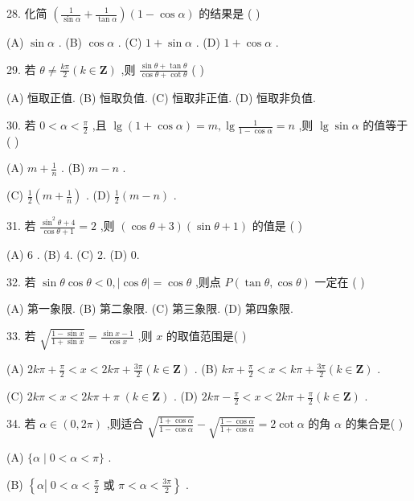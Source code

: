 \documentclass[10pt]{article}
\begin{document}
28. 化简 \(\left( {\frac{1}{\sin \alpha } + \frac{1}{\tan \alpha }}\right) \left( {1 - \cos \alpha }\right)\) 的结果是 ( )

(A) \(\sin \alpha\) . (B) \(\cos \alpha\) . (C) \(1 + \sin \alpha\) . (D) \(1 + \cos \alpha\) .

29. 若 \(\theta  \neq  \frac{k\pi }{2}\left( {k \in  \mathbf{Z}}\right)\) ,则 \(\frac{\sin \theta  + \tan \theta }{\cos \theta  + \cot \theta }\) (   )

(A) 恒取正值. (B) 恒取负值. (C) 恒取非正值. (D) 恒取非负值.

30. 若 \(0 < \alpha  < \frac{\pi }{2}\) ,且 \(\lg \left( {1 + \cos \alpha }\right)  = m,\lg \frac{1}{1 - \cos \alpha } = n\) ,则 \(\lg \sin \alpha\) 的值等于 ( )

(A) \(m + \frac{1}{n}\) . (B) \(m - n\) .

(C) \(\frac{1}{2}\left( {m + \frac{1}{n}}\right)\) . (D) \(\frac{1}{2}\left( {m - n}\right)\) .

31. 若 \(\frac{{\sin }^{2}\theta  + 4}{\cos \theta  + 1} = 2\) ,则 \(\left( {\cos \theta  + 3}\right) \left( {\sin \theta  + 1}\right)\) 的值是 ( )

(A) 6 . (B) 4. (C) 2. (D) 0.

32. 若 \(\sin \theta \cos \theta  < 0,\left| {\cos \theta }\right|  = \cos \theta\) ,则点 \(P\left( {\tan \theta ,\cos \theta }\right)\) 一定在 ( )

(A) 第一象限. (B) 第二象限. (C) 第三象限. (D) 第四象限.

33. 若 \(\sqrt{\frac{1 - \sin x}{1 + \sin x}} = \frac{\sin x - 1}{\cos x}\) ,则 \(x\) 的取值范围是(   )

(A) \({2k\pi } + \frac{\pi }{2} < x < {2k\pi } + \frac{3\pi }{2}\left( {k \in  \mathbf{Z}}\right)\) . (B) \({k\pi } + \frac{\pi }{2} < x < {k\pi } + \frac{3\pi }{2}\left( {k \in  \mathbf{Z}}\right)\) .

(C) \({2k\pi } < x < {2k\pi } + \pi \;\left( {k \in  \mathbf{Z}}\right)\) . (D) \({2k\pi } - \frac{\pi }{2} < x < {2k\pi } + \frac{\pi }{2}\left( {k \in  \mathbf{Z}}\right)\) .

34. 若 \(\alpha  \in  \left( {0,{2\pi }}\right)\) ,则适合 \(\sqrt{\frac{1 + \cos \alpha }{1 - \cos \alpha }} - \sqrt{\frac{1 - \cos \alpha }{1 + \cos \alpha }} = 2\cot \alpha\) 的角 \(\alpha\) 的集合是( )

(A) \(\{ \alpha  \mid  0 < \alpha  < \pi \}\) .

(B) \(\left\{  {\alpha \left| {\;0 < \alpha  < \frac{\pi }{2}}\right. \text{ 或 }\pi  < \alpha  < \frac{3\pi }{2}}\right\}\) .
\end{document}
